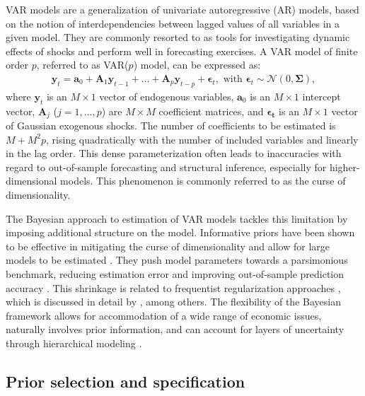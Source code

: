\documentclass[article,nojss]{jss} %
\begin{document}
VAR models are a generalization of univariate autoregressive (AR) models, based on the notion of interdependencies between lagged values of all variables in a given model.
They are commonly resorted to as tools for investigating dynamic effects of shocks and perform well in forecasting exercises. A VAR model of finite order $p$, referred to as VAR($p$) model, can be expressed as:
\begin{align} \label{equ:var}
  \boldsymbol{y}_t = \boldsymbol{a}_0 + \boldsymbol{A}_1 \boldsymbol{y}_{t-1} + \dots + \boldsymbol{A}_p \boldsymbol{y}_{t-p} + \boldsymbol{\epsilon}_t,
  \text{ with }
  \boldsymbol{\epsilon}_t \sim \mathcal{N} (0, \boldsymbol{\Sigma}),
\end{align}
where $\boldsymbol{y}_t$ is an $M \times 1$ vector of endogenous variables, $\boldsymbol{a}_0$ is an $M \times 1$ intercept vector, $\boldsymbol{A}_j$ ($j = 1, \ldots, p$) are $M \times M$ coefficient matrices, and $\boldsymbol{\epsilon_t}$ is an $M \times 1$ vector of Gaussian exogenous shocks.
The number of coefficients to be estimated is $M + M^2 p$, rising quadratically with the number of included variables and linearly in the lag order.
This dense parameterization often leads to inaccuracies with regard to out-of-sample forecasting and structural inference, especially for higher-dimensional models. This phenomenon is commonly referred to as the curse of dimensionality.

The Bayesian approach to estimation of VAR models tackles this limitation by imposing additional structure on the model. Informative priors have been shown to be effective in mitigating the curse of dimensionality and allow for large models to be estimated \citep[see][]{banbura2010, doan1984}. They push model parameters towards a parsimonious benchmark, reducing estimation error and improving out-of-sample prediction accuracy \citep[see][]{koop2013}.
This shrinkage is related to frequentist regularization approaches \citep{hoerl1970, tibshirani1996}, which is discussed in detail by \cite{demol2008}, among others.
The flexibility of the Bayesian framework allows for accommodation of a wide range of economic issues, naturally involves prior information, and can account for layers of uncertainty through hierarchical modeling \citep{gelman2013}.

\subsection{Prior selection and specification} \label{subsec:prior}
\end{document}
